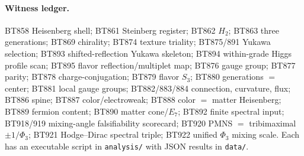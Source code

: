 \documentclass[11pt]{article}
\begin{document}
\paragraph{Witness ledger.} BT858 Heisenberg shell; BT861 Steinberg
register; BT862 $H_2$; BT863 three generations; BT869 chirality; BT874
texture triality; BT875/891 Yukawa selection; BT893 shifted-reflection
Yukawa skeleton; BT894 within-grade Higgs profile scan; BT895 flavor
reflection/multiplet map; BT876 gauge group; BT877 parity; BT878
charge-conjugation; BT879 flavor $S_3$; BT880 generations $=$ center;
BT881 local gauge groups; BT882/883/884 connection, curvature, flux;
BT886 spine; BT887 color/electroweak; BT888 color $=$ matter Heisenberg;
BT889 fermion content; BT890 matter cone/$E_7$; BT892 finite spectral
input; BT918/919 mixing-angle falsifiability scorecard; BT920 PMNS $=$
tribimaximal $\pm 1/\Phi_3$; BT921 Hodge--Dirac spectral triple;
BT922 unified $\Phi_3$ mixing scale. Each has an executable script in
\texttt{analysis/} with JSON results in \texttt{data/}.
\end{document}
